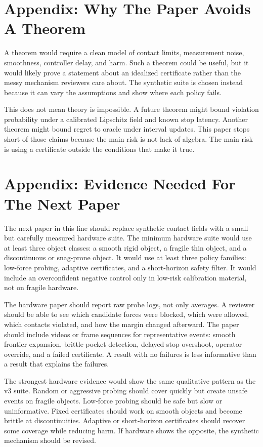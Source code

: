 \documentclass{article}
\begin{document}
\section{Appendix: Why The Paper Avoids A Theorem}

A theorem would require a clean model of contact limits, measurement noise,
smoothness, controller delay, and harm. Such a theorem could be useful, but it
would likely prove a statement about an idealized certificate rather than the
messy mechanism reviewers care about. The synthetic suite is chosen instead
because it can vary the assumptions and show where each policy fails.

This does not mean theory is impossible. A future theorem might bound violation
probability under a calibrated Lipschitz field and known stop latency. Another
theorem might bound regret to oracle under interval updates. This paper stops
short of those claims because the main risk is not lack of algebra. The main
risk is using a certificate outside the conditions that make it true.

\section{Appendix: Evidence Needed For The Next Paper}

The next paper in this line should replace synthetic contact fields with a
small but carefully measured hardware suite. The minimum hardware suite would
use at least three object classes: a smooth rigid object, a fragile thin object,
and a discontinuous or snag-prone object. It would use at least three policy
families: low-force probing, adaptive certificates, and a short-horizon safety
filter. It would include an overconfident negative control only in low-risk
calibration material, not on fragile hardware.

The hardware paper should report raw probe logs, not only averages. A reviewer
should be able to see which candidate forces were blocked, which were allowed,
which contacts violated, and how the margin changed afterward. The paper
should include videos or frame sequences for representative events: smooth
frontier expansion, brittle-pocket detection, delayed-stop overshoot,
operator override, and a failed certificate. A result with no failures is less
informative than a result that explains the failures.

The strongest hardware evidence would show the same qualitative pattern as the
v3 suite. Random or aggressive probing should cover quickly but create unsafe
events on fragile objects. Low-force probing should be safe but slow or
uninformative. Fixed certificates should work on smooth objects and become
brittle at discontinuities. Adaptive or short-horizon certificates should
recover some coverage while reducing harm. If hardware shows the opposite, the
synthetic mechanism should be revised.
\end{document}
